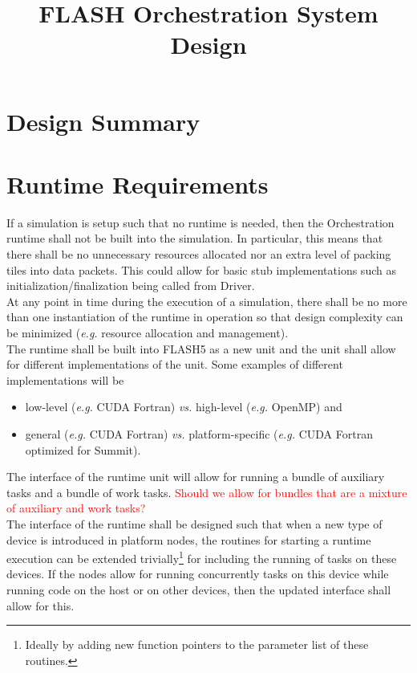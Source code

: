 \documentclass{article}
\title{FLASH Orchestration System Design}
\begin{document}
\theoremstyle{definition} %
\newtheorem{req}{Req}[section]

\maketitle

\section{Design Summary}

\section{Runtime Requirements}
If a simulation is setup such that no runtime is needed, then the Orchestration
runtime shall not be built into the simulation.  In particular, this means that
there shall be no unnecessary resources allocated nor an extra level of packing
tiles into data packets.  This could allow for basic stub implementations such
as initialization/finalization being called from Driver.\\

At any point in time during the execution of a simulation, there shall be no more
than one instantiation of the runtime in operation so that design complexity can
be minimized (\textit{e.g.} resource allocation and management).\\

The runtime shall be built into FLASH5 as a new unit and the unit shall allow
for different implementations of the unit.  Some examples of different
implementations will be
\begin{itemize}
\item{low-level (\textit{e.g.} CUDA Fortran) \textit{vs.} high-level
(\textit{e.g.} OpenMP) and}
\item{general (\textit{e.g.} CUDA Fortran) \textit{vs.}} platform-specific
(\textit{e.g.} CUDA Fortran optimized for Summit).
\end{itemize}

The interface of the runtime unit will allow for running a bundle of auxiliary
tasks and a bundle of work tasks.  \textcolor{red}{Should we allow for bundles
that are a mixture of auxiliary and work tasks?}\\

The interface of the runtime shall be designed such  that when a new type of
device is introduced in platform nodes, the routines for starting a runtime
execution can be extended trivially\footnote{Ideally by adding new function
pointers to the parameter list of these routines.} for including the running of
tasks on these devices.  If the nodes allow for running concurrently tasks on
this device while running code on the host or on other devices, then the updated
interface shall allow for this.\\
\end{document}

